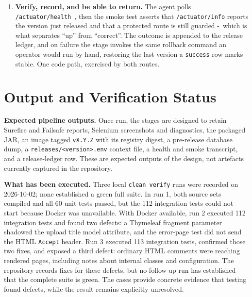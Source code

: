 \documentclass[10pt,a4paper]{article}
\begin{document}
\begin{enumerate}[leftmargin=1.9em]
        pre-release gate: volumes verified, a MySQL dump taken, and the release's metadata written
        under \texttt{releases/}; a host that has released before and has lost a volume is refused
        rather than upgraded. The gate rewrites exactly two non-secret keys -\ image tag
        and environment name -\ then \texttt{compose pull} and
        \texttt{up -{}-no-build -{}-wait} swap in the published container. No \texttt{build:}
        exists in the deployment composition, so a host runs the tested artefact or fails.
  \item \textbf{Verify, record, and be able to return.} The agent polls
        \texttt{/actuator/health}~\cite{springboot}, then the smoke test asserts that
        \texttt{/actuator/info} reports the version just released and that a protected route is
        still guarded -\ which is what separates ``up'' from ``correct''. The outcome is
        appended to the release ledger, and on failure the stage invokes the same rollback command
        an operator would run by hand, restoring the last version a \texttt{success} row marks
        stable. One code path, exercised by both routes.
\end{enumerate}

\newpage

\section{Output and Verification Status}

\textbf{Expected pipeline outputs.} Once run, the stages are designed to retain Surefire and
Failsafe reports, Selenium screenshots and diagnostics, the packaged JAR, an image tagged
\texttt{vX.Y.Z} with its registry digest, a pre-release database dump, a
\texttt{releases/<version>.env} context file, a health and smoke transcript, and a release-ledger
row. These are expected outputs of the design, not artefacts currently captured in the repository.

\textbf{What has been executed.} Three local \texttt{clean verify} runs were recorded on
2026-10-02; none established a green full suite. In run 1, both source sets compiled and all 60
unit tests passed, but the 112 integration tests could not start because Docker was unavailable.
With Docker available, run 2 executed 112 integration tests and found two defects: a Thymeleaf
fragment parameter shadowed the upload title model attribute, and the error-page test did not send
the HTML \texttt{Accept} header. Run 3 executed 113 integration tests, confirmed those two fixes,
and exposed a third defect: ordinary HTML comments were reaching rendered pages, including notes
about internal classes and configuration. The repository records fixes for these defects, but no
follow-up run has established that the complete suite is green. The cases provide concrete
evidence that testing found defects, while the result remains explicitly unresolved.
\end{document}
